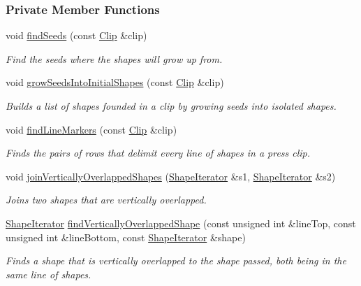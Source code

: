 \subsubsection*{Private Member Functions}
\begin{CompactItemize}
\item 
void \hyperlink{class_segmenter_bacab187b543a51c5322c01fc0a29ffb}{findSeeds} (const \hyperlink{class_clip}{Clip} \&clip)
\begin{CompactList}\small\item\em Find the seeds where the shapes will grow up from. \item\end{CompactList}\item 
void \hyperlink{class_segmenter_72c007e345fad7abbf6e9d4edb615a50}{growSeedsIntoInitialShapes} (const \hyperlink{class_clip}{Clip} \&clip)
\begin{CompactList}\small\item\em Builds a list of shapes founded in a clip by growing seeds into isolated shapes. \item\end{CompactList}\item 
void \hyperlink{class_segmenter_ad8893282742e811dd7fff172ec03c85}{findLineMarkers} (const \hyperlink{class_clip}{Clip} \&clip)
\begin{CompactList}\small\item\em Finds the pairs of rows that delimit every line of shapes in a press clip. \item\end{CompactList}\item 
void \hyperlink{class_segmenter_a6fc98922155143cf36f542118c33f3a}{joinVerticallyOverlappedShapes} (\hyperlink{class_segmenter_1190be7ec081a96ee2ae91e0bb256a0d}{ShapeIterator} \&s1, \hyperlink{class_segmenter_1190be7ec081a96ee2ae91e0bb256a0d}{ShapeIterator} \&s2)
\begin{CompactList}\small\item\em Joins two shapes that are vertically overlapped. \item\end{CompactList}\item 
\hyperlink{class_segmenter_1190be7ec081a96ee2ae91e0bb256a0d}{ShapeIterator} \hyperlink{class_segmenter_0961de0db6a0b1de51882024bfc830a1}{findVerticallyOverlappedShape} (const unsigned int \&lineTop, const unsigned int \&lineBottom, const \hyperlink{class_segmenter_1190be7ec081a96ee2ae91e0bb256a0d}{ShapeIterator} \&shape)
\begin{CompactList}\small\item\em Finds a shape that is vertically overlapped to the shape passed, both being in the same line of shapes. \item\end{CompactList}\end{CompactItemize}
